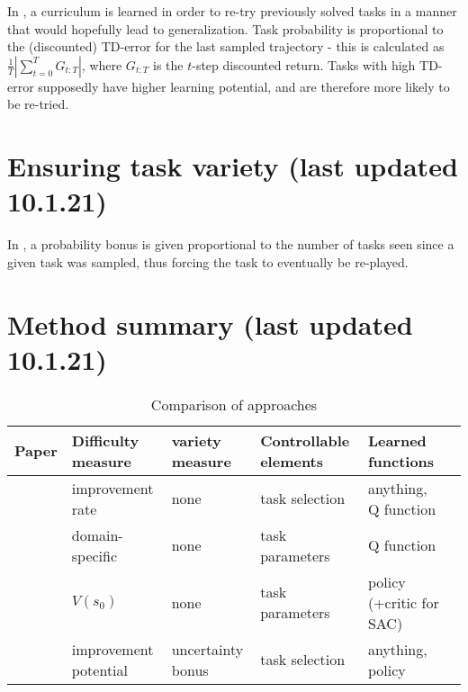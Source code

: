 \documentclass[letterpaper]{article}
\theoremstyle{definition}
\begin{document}
In \cite{Jiang2020}, a curriculum is learned in order to re-try previously solved tasks in a manner that would hopefully lead to generalization. Task probability is proportional to the (discounted) TD-error for the last sampled trajectory - this is calculated as $ \frac{1}{T} | \sum_{t=0}^{T} {G_{t:T}}|$, where $G_{t:T}$ is the $t$-step discounted return. Tasks with high TD-error supposedly have higher learning potential, and are therefore more likely to be re-tried. 

\section{Ensuring task variety (last updated 10.1.21)} \label{sec:variety}

In \cite{Jiang2020}, a probability bonus is given proportional to the number of tasks seen since a given task was sampled, thus forcing the task to eventually be re-played.

\section{Method summary (last updated 10.1.21)} \label{sec:summary}

\begin{table*}
\caption{Comparison of approaches}
\begin{tabular}{|l | l | l | l  | l| l|}
	\hline
	Paper & Difficulty measure & variety measure  & Controllable elements & Learned functions    \\ \hline	
	\cite{Matiisen2020} & improvement rate & none & task selection & anything, Q function \\ \hline
	\cite{Feng2020} & domain-specific & none & task parameters & Q function \\ \hline
	\cite{Klink2020} & $V(s_0)$ & none & task parameters & policy (+critic for SAC) \\ \hline
	\cite{Jiang2020} & improvement potential & uncertainty bonus & task selection & anything, policy \\ \hline
	
\end{tabular}
\end{table*}

\clearpage


\end{document}
